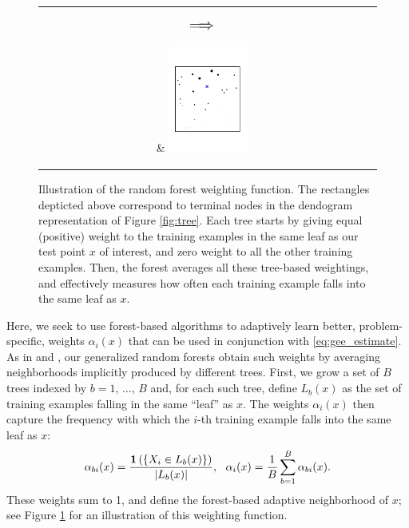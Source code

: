 \documentclass[aos]{imsart}
\theoremstyle{plain}
\theoremstyle{definition}
\theoremstyle{remark}
\begin{document}
\begin{CJK}{UTF8}{gbsn}
{\begin{figure}
\begin{center}
\vspace{-\baselineskip}

\begin{tabular}{cc}
\parbox[b][0.25\textwidth][c]{0.12\textwidth}{$$\mathlarger{\mathlarger{\Longrightarrow}}$$} &
\includegraphics[width = 0.25\textwidth, trim=15mm 40mm 20mm 40mm, clip = TRUE]{tree_match_ensemble.pdf}
\end{tabular}
\end{center}
\caption{Illustration of the random forest weighting function. The rectangles depticted above correspond
to terminal nodes in the dendogram representation of Figure \ref{fig:tree}. Each tree starts by giving equal
(positive) weight to the training examples in the same leaf as our test point $x$ of interest, and zero
weight to all the other training examples. Then, the forest averages all these tree-based weightings,
and effectively measures how often each training example falls into the same leaf as $x$.}
\label{fig:weighting}
\vspace{-1.5\baselineskip}
\end{figure}

Here, we seek to use forest-based algorithms to adaptively learn better, problem-specific,
weights $\alpha_i(x)$ that can be used in conjunction with \eqref{eq:gee_estimate}.
As in \citet{hothorn2004bagging} and \citet{meinshausen2006quantile}, our generalized random forests obtain such weights
by averaging neighborhoods implicitly produced by different trees. First, we grow a set of
$B$ trees indexed by $b = 1, \, ..., \, B$ and, for each such tree, define $L_b(x)$
as the set of training examples falling in the same ``leaf'' as $x$. The weights $\alpha_i(x)$ then
capture the frequency with which the $i$-th training example falls into the same leaf as $x$:
\begin{equation}
\label{eq:forest_weights}
\alpha_{bi}(x) = \frac{\1\p{\cb{X_i \in L_b(x)}}}{\abs{L_b(x)}}, \ \ \alpha_i(x) = \frac{1}{B} \sum_{b = 1}^B \alpha_{bi}(x).
\end{equation}
These weights sum to 1, and define the forest-based adaptive neighborhood of $x$; see Figure \ref{fig:weighting} for an illustration of this weighting function.

}
\end{CJK}
\end{document}
